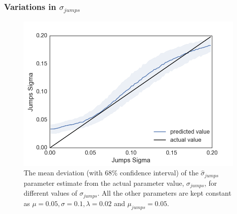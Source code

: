 \documentclass[11pt,oneside,openany,a4paper,english, report, goldenblock
]{usthesis}
\begin{document}
\clearpage
\subsubsection{Variations in $\sigma_{jumps}$}
\begin{figure}[h]
	\centering
	\includegraphics[width=0.43\linewidth]{Images/Output-Sensitivity-Results/ConvolutionalNN-MultipleOutput-ELU/Varying-Jumps_sigma/Jumps_Sigma}
	\caption{The mean deviation (with $68\%$ confidence interval) of the $\hat{\sigma}_{jumps}$ parameter estimate from the actual parameter value, $\sigma_{jumps}$, for different values of $\sigma_{jumps}$. All the other parameters are kept constant as $\mu = 0.05, \sigma = 0.1, \lambda = 0.02$ and $\mu_{jumps} = 0.05$.}
	\label{fig:appendix:sensitivity_test:multiple_output:varying_jumps_sigma:jumps_sigma}
\end{figure}
\end{document}
